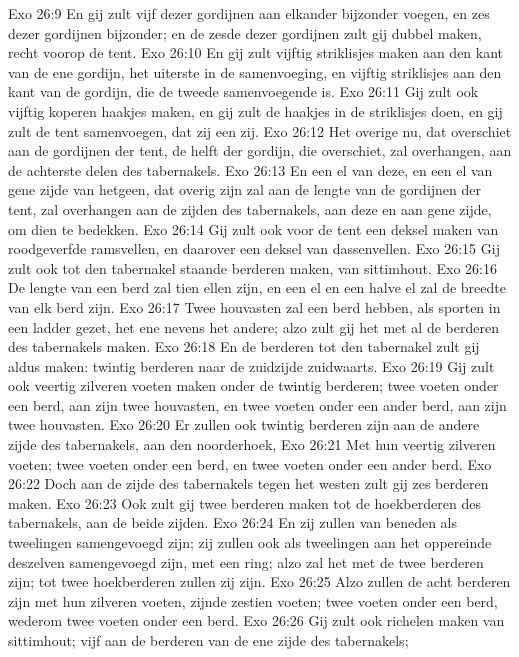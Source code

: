 Exo 26:9  En gij zult vijf dezer gordijnen aan elkander bijzonder voegen, en zes dezer gordijnen bijzonder; en de zesde dezer gordijnen zult gij dubbel maken, recht voorop de tent.
Exo 26:10  En gij zult vijftig striklisjes maken aan den kant van de ene gordijn, het uiterste in de samenvoeging, en vijftig striklisjes aan den kant van de gordijn, die de tweede samenvoegende is.
Exo 26:11  Gij zult ook vijftig koperen haakjes maken, en gij zult de haakjes in de striklisjes doen, en gij zult de tent samenvoegen, dat zij een zij.
Exo 26:12  Het overige nu, dat overschiet aan de gordijnen der tent, de helft der gordijn, die overschiet, zal overhangen, aan de achterste delen des tabernakels.
Exo 26:13  En een el van deze, en een el van gene zijde van hetgeen, dat overig zijn zal aan de lengte van de gordijnen der tent, zal overhangen aan de zijden des tabernakels, aan deze en aan gene zijde, om dien te bedekken.
Exo 26:14  Gij zult ook voor de tent een deksel maken van roodgeverfde ramsvellen, en daarover een deksel van dassenvellen.
Exo 26:15  Gij zult ook tot den tabernakel staande berderen maken, van sittimhout.
Exo 26:16  De lengte van een berd zal tien ellen zijn, en een el en een halve el zal de breedte van elk berd zijn.
Exo 26:17  Twee houvasten zal een berd hebben, als sporten in een ladder gezet, het ene nevens het andere; alzo zult gij het met al de berderen des tabernakels maken.
Exo 26:18  En de berderen tot den tabernakel zult gij aldus maken: twintig berderen naar de zuidzijde zuidwaarts.
Exo 26:19  Gij zult ook veertig zilveren voeten maken onder de twintig berderen; twee voeten onder een berd, aan zijn twee houvasten, en twee voeten onder een ander berd, aan zijn twee houvasten.
Exo 26:20  Er zullen ook twintig berderen zijn aan de andere zijde des tabernakels, aan den noorderhoek,
Exo 26:21  Met hun veertig zilveren voeten; twee voeten onder een berd, en twee voeten onder een ander berd.
Exo 26:22  Doch aan de zijde des tabernakels tegen het westen zult gij zes berderen maken.
Exo 26:23  Ook zult gij twee berderen maken tot de hoekberderen des tabernakels, aan de beide zijden.
Exo 26:24  En zij zullen van beneden als tweelingen samengevoegd zijn; zij zullen ook als tweelingen aan het oppereinde deszelven samengevoegd zijn, met een ring; alzo zal het met de twee berderen zijn; tot twee hoekberderen zullen zij zijn.
Exo 26:25  Alzo zullen de acht berderen zijn met hun zilveren voeten, zijnde zestien voeten; twee voeten onder een berd, wederom twee voeten onder een berd.
Exo 26:26  Gij zult ook richelen maken van sittimhout; vijf aan de berderen van de ene zijde des tabernakels;
